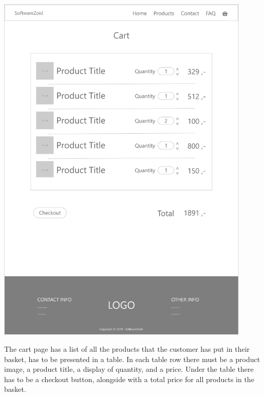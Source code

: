 \documentclass[11pt]{report}
\begin{document}
\begin{center}
\includegraphics[height=17cm]{page6}
\end{center}
\noindent The cart page has a list of all the products that the customer has put in their basket, has to be presented in a table. In each table row there must be a product image, a product title, a display of quantity, and a price. Under the table there has to be a checkout button, alongside with a total price for all products in the basket.
\end{document}

